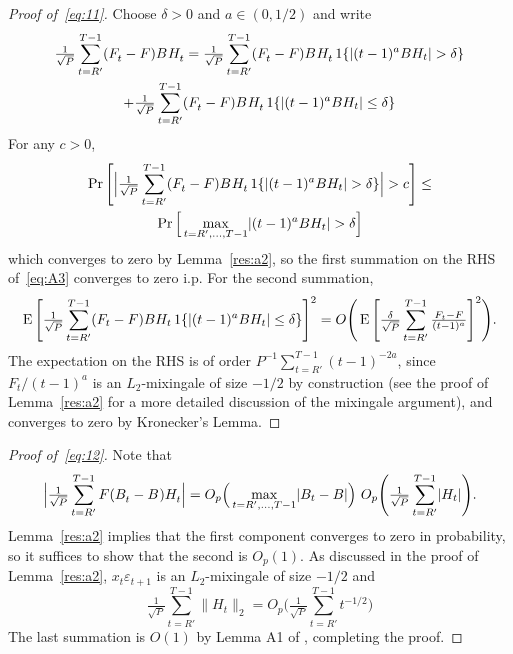 \documentclass[12pt,fleqn]{article}
\begin{document}
\begin{proof}[Proof of~\eqref{eq:11}]
Choose $\delta > 0$ and $a \in (0,1/2)$ and write
\begin{multline}\label{eq:A3}
  \tfrac{1}{\sqrt{P}} \sum_{t=R'}^{T-1} (F_t^{} - F) B^{} H_t^{} =
  \tfrac{1}{\sqrt{P}} \sum_{t=R'}^{T-1} (F_t^{} - F) B^{} H_t^{} \operatorname{1}\{ \lvert (t - 1)^a B H_t \rvert > \delta\} \\
  + \tfrac{1}{\sqrt{P}} \sum_{t=R'}^{T-1} (F_t^{} - F) B^{} H_t^{} \operatorname{1}\{ \lvert (t - 1)^a B H_t \rvert \leq \delta\}
\end{multline}
For any $c > 0$,
\begin{multline*}
  \Pr\Bigg[ \Big\lvert \tfrac{1}{\sqrt{P}} \sum_{t=R'}^{T-1} (F_t^{} - F) B^{} H_t^{} \operatorname{1}\{ \lvert (t-1)^a B H_t \rvert > \delta\} \Big\rvert > c \Bigg]
  \leq \\ \Pr\Big[\max_{t=R',\dots,T-1} \lvert (t-1)^a B H_t \rvert > \delta \Big]
\end{multline*}
which converges to zero by Lemma~\ref{res:a2}, so the first summation on
the RHS of~\eqref{eq:A3} converges to zero i.p. For the second summation,
\begin{equation*}
  \operatorname{E} \Bigg[ \tfrac{1}{\sqrt{P}} \sum_{t=R'}^{T-1} (F_t - F) B H_t
    \operatorname{1}\{\lvert (t-1)^a B H_t \rvert \leq \delta\}\Bigg]^2
   = O\Bigg(\operatorname{E} \Bigg[ \tfrac{\delta}{\sqrt{P}}
    \sum_{t=R'}^{T-1} \tfrac{F_t - F}{(t-1)^a} \Bigg]^2\Bigg).
\end{equation*}
The expectation on the RHS is of order
$P^{-1} \sum_{t=R'}^{T-1} (t-1)^{-2a}$, since $F_t / (t-1)^a$ is an
$L_2$-mixingale of size $-1/2$ by construction (see the proof of
Lemma~\ref{res:a2} for a more detailed discussion of the mixingale
argument), and converges to zero by Kronecker's Lemma.
\end{proof}

\begin{proof}[Proof of~\eqref{eq:12}]
Note that
\begin{equation*}
  \Big\lvert \tfrac{1}{\sqrt{P}} \sum_{t=R'}^{T-1} F (B_t^{} - B^{}) H_t^{} \Big\rvert =
  O_p\Big(\max_{t=R',\dots,T-1} \lvert B_t - B\rvert\Big)\
  O_p\Bigg(\tfrac{1}{\sqrt{P}} \sum_{t=R'}^{T-1} \lvert H_t \rvert \Bigg).
\end{equation*}
Lemma~\ref{res:a2} implies that the first component converges to
zero in probability, so it suffices to show that the second is
$O_p(1)$. As discussed in the proof of Lemma~\ref{res:a2},
$x_t \varepsilon_{t+1}$ is an $L_2$-mixingale
of size $-1/2$ and
\begin{equation*}
  \tfrac{1}{\sqrt{P}} \sum_{t=R'}^{T-1} \lVert H_t \rVert_2
  = O_p\Bigg(\tfrac{1}{\sqrt{P}} \sum_{t=R'}^{T-1} t^{-1/2}\Bigg)
\end{equation*}
The last summation is $O(1)$ by Lemma A1 of \citet{Wes:96}, completing
the proof.
\end{proof}
\end{document}
